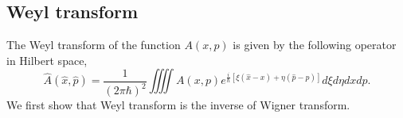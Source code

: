 \documentclass[aps,prb,superscriptaddress]{revtex4}
\begin{document}
\subsection{Weyl transform}
The Weyl transform of the function $A(x,p)$ is given by the following operator in Hilbert space,	
\begin{equation}
	\hat A(\hat x,\hat p) =  \frac{1}{(2\pi \hbar)^2} \iiiint A(x,p) e^{\frac{i}{\hbar}[\xi(\hat x -x)+\eta(\hat p - p)]} d\xi d\eta dx dp.
\end{equation}
We first show that Weyl transform is the inverse of Wigner transform.


\end{document}
